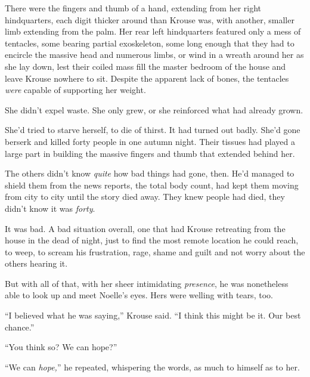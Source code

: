 There were the fingers and thumb of a hand, extending from her right hindquarters, each digit thicker around than Krouse was, with another, smaller limb extending from the palm.  Her rear left hindquarters featured only a mess of tentacles, some bearing partial exoskeleton, some long enough that they had to encircle the massive head and numerous limbs, or wind in a wreath around her as she lay down, lest their coiled mass fill the master bedroom of the house and leave Krouse nowhere to sit.  Despite the apparent lack of bones, the tentacles \emph{were }capable of supporting her weight.



She didn't expel waste.  She only grew, or she reinforced what had already grown.



She'd tried to starve herself, to die of thirst.  It had turned out badly.  She'd gone berserk and killed forty people in one autumn night.  Their tissues had played a large part in building the massive fingers and thumb that extended behind her.



The others didn't know \emph{quite} how bad things had gone, then.  He'd managed to shield them from the news reports, the total body count, had kept them moving from city to city until the story died away.  They knew people had died, they didn't know it was \emph{forty}.



It was bad.  A bad situation overall, one that had Krouse retreating from the house in the dead of night, just to find the most remote location he could reach, to weep, to scream his frustration, rage, shame and guilt and not worry about the others hearing it.



But with all of that, with her sheer intimidating \emph{presence}, he was nonetheless able to look up and meet Noelle's eyes.  Hers were welling with tears, too.



``I believed what he was saying,'' Krouse said.  ``I think this might be it.  Our best chance.''



``You think so?  We can hope?''



``We can \emph{hope,}'' he repeated, whispering the words, as much to himself as to her.



\sectionbreak



